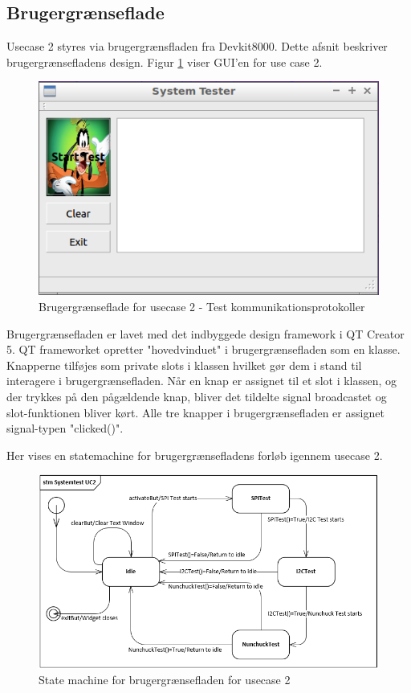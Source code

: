 \subsection{Brugergrænseflade}
Usecase 2 styres via brugergrænsfladen fra Devkit8000.
Dette afsnit beskriver brugergrænsefladens design. Figur \ref{fig:GUIPic} viser GUI'en for use case 2.

\begin{figure}[H]
	\centering
	\includegraphics[width=\textwidth]{Afsnit/DesignOgImplementering/images/GUIPic}
	\caption{Brugergrænseflade for usecase 2 - Test kommunikationsprotokoller}
	\label{fig:GUIPic}
\end{figure}

Brugergrænsefladen er lavet med det indbyggede design framework i QT Creator 5.
QT frameworket opretter "hovedvinduet" i brugergrænsefladen som en klasse. Knapperne tilføjes som private slots i klassen
hvilket gør dem i stand til interagere i brugergrænsefladen. Når en knap er assignet til et slot i klassen, og der trykkes på den pågældende knap, bliver det tildelte signal broadcastet
og slot-funktionen bliver kørt. Alle tre knapper i brugergrænsefladen er assignet signal-typen "clicked()".

Her vises en statemachine for brugergrænsefladens forløb igennem usecase 2.

\begin{figure}[H]
	\centering
	\includegraphics[width=1.2\textwidth]{Afsnit/DesignOgImplementering/images/StateMachineUC2}
	\caption{State machine for brugergrænsefladen for usecase 2}
	\label{fig:StateMachineUC2}
\end{figure}

